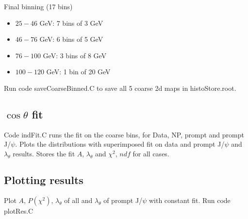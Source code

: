 \documentclass{article}
\newcommand{\cost}{\cos\theta}
\begin{document}
Final binning (17 bins)
\begin{itemize}
\item $25-46$ GeV: 7 bins of 3 GeV
\item $46-76$ GeV: 6 bins of 5 GeV
\item $76-100$ GeV: 3 bins of 8 GeV
\item $100-120$ GeV: 1 bin of 20 GeV
\end{itemize}

Run code saveCoarseBinned.C to save all 5 coarse 2d maps in histoStore.root.

\subsection{$\cost$ fit}

Code indFit.C runs the fit on the coarse bins, for  Data, NP, prompt and prompt J/$\psi$. Plots the distributions with superimposed fit on data and prompt J/$\psi$ and $\lambda_\theta$ results. Stores the fit $A$, $\lambda_\theta$ and $\chi^2$, $ndf$ for all cases. 

\subsection{Plotting results}

Plot $A$, $P(\chi^2)$, $\lambda_\theta$ of all and $\lambda_\theta$ of prompt J/$\psi$ with constant fit. Run code plotRes.C
\end{document}
